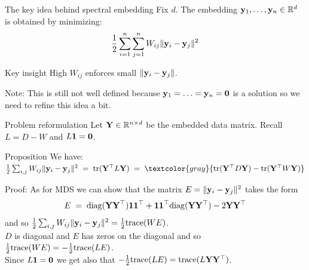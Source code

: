 \documentclass[11pt,handout,aspectratio=169]{beamer}
\begin{document}
\begin{frame}{The key idea behind spectral embedding}
Fix $d$. The embedding $\mathbf{y}_1,\ldots,\mathbf{y}_n\in \mathbb R^d$ is obtained by minimizing:
\[\frac{1}{2}\sum_{i=1}^n\sum_{j=1}^n W_{ij}\|\mathbf{y}_i - \mathbf{y}_j\|^2\]
\begin{alertblock}{Key insight}
	High $W_{ij}$ enforces small $\|\mathbf{y}_i-\mathbf{y}_j\|$.
\end{alertblock}
Note: This is still not well defined because $\mathbf{y}_1=\ldots=\mathbf{y}_n=\boldsymbol 0$ is a solution so we need to refine this idea a bit.  
\end{frame}


\begin{frame}{Problem reformulation}
Let $\mathbf{Y}\in \mathbb R^{n\times d}$ be the embedded data matrix. Recall $L=D-W$ and $L\boldsymbol 1=\boldsymbol 0$.
\begin{alertblock}{Proposition}
We have:\qquad $\frac{1}{2}\sum_{i,j} W_{ij}\|\y_i - \y_j\|^2 \;=\; \text{tr}(\Y^{\top} L \Y)\;=\;\textcolor{gray}{\text{tr}(\Y^{\top} D \Y)-\text{tr}(\Y^{\top} W \Y)}$
\end{alertblock}
Proof: As for MDS we can show that the matrix $E=\|\mathbf{y}_i-\mathbf{y}_j\|^2$ takes the form
$$
E\;=\;{\rm diag}(\mathbf{Y}\mathbf{Y}^\top)\boldsymbol 1\boldsymbol 1^\top+\boldsymbol 1\boldsymbol 1^\top{\rm diag}(\mathbf{Y}\mathbf{Y}^\top)-2\mathbf{Y}\mathbf{Y}^\top
$$
and so $\tfrac12 \sum_{i,j}W_{ij}\|\mathbf{y}_i-\mathbf{y}_j\|^2 = \tfrac12\text{trace}(W E)$.\\[2mm]	
$D$ is diagonal and $E$ has zeros on the diagonal and so $\tfrac12\text{trace}(W E)=-\tfrac12\text{trace}(L E)$.\\[2mm]
	Since $L\boldsymbol 1=\boldsymbol 0$ we get also that $-\tfrac12\text{trace}(L E)=\text{trace}(L\mathbf{Y}\mathbf{Y}^\top)$. 
\end{frame}
\end{document}
